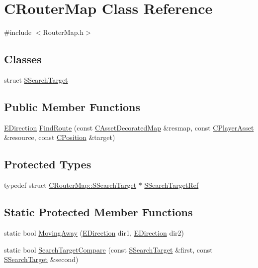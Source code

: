 \hypertarget{classCRouterMap}{}\section{C\+Router\+Map Class Reference}
\label{classCRouterMap}


{\ttfamily \#include $<$Router\+Map.\+h$>$}

\subsection*{Classes}
\begin{DoxyCompactItemize}
\item 
struct \hyperlink{structCRouterMap_1_1SSearchTarget}{S\+Search\+Target}
\end{DoxyCompactItemize}
\subsection*{Public Member Functions}
\begin{DoxyCompactItemize}
\item 
\hyperlink{GameDataTypes_8h_acb2b033915f6659a71a38b5aa6e4eb42}{E\+Direction} \hyperlink{classCRouterMap_ac638dca74d6ebe3602db9f7c69881146}{Find\+Route} (const \hyperlink{classCAssetDecoratedMap}{C\+Asset\+Decorated\+Map} \&resmap, const \hyperlink{classCPlayerAsset}{C\+Player\+Asset} \&resource, const \hyperlink{classCPosition}{C\+Position} \&target)
\end{DoxyCompactItemize}
\subsection*{Protected Types}
\begin{DoxyCompactItemize}
\item 
typedef struct \hyperlink{structCRouterMap_1_1SSearchTarget}{C\+Router\+Map\+::\+S\+Search\+Target} $\ast$ \hyperlink{classCRouterMap_a6996ef024b965180f73c433ba6f50154}{S\+Search\+Target\+Ref}
\end{DoxyCompactItemize}
\subsection*{Static Protected Member Functions}
\begin{DoxyCompactItemize}
\item 
static bool \hyperlink{classCRouterMap_adf9041b4e1face1308c556c0ba0de9af}{Moving\+Away} (\hyperlink{GameDataTypes_8h_acb2b033915f6659a71a38b5aa6e4eb42}{E\+Direction} dir1, \hyperlink{GameDataTypes_8h_acb2b033915f6659a71a38b5aa6e4eb42}{E\+Direction} dir2)
\item 
static bool \hyperlink{classCRouterMap_a1a581c85a34b6d0fcc5ddc3d0ae7fb00}{Search\+Target\+Compare} (const \hyperlink{structCRouterMap_1_1SSearchTarget}{S\+Search\+Target} \&first, const \hyperlink{structCRouterMap_1_1SSearchTarget}{S\+Search\+Target} \&second)
\end{DoxyCompactItemize}
